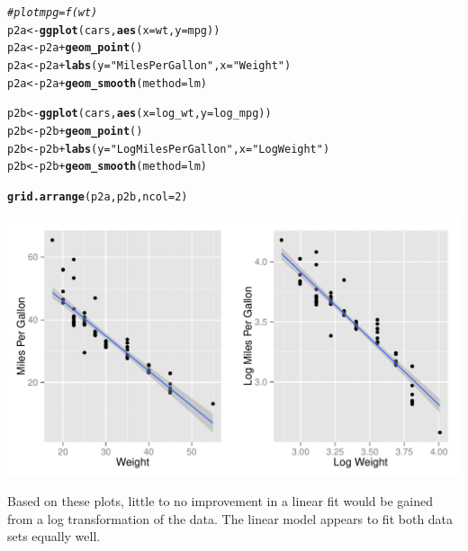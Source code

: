 \documentclass{article}\usepackage[]{graphicx}\usepackage[]{color}
\makeatletter
\def\maxwidth{ %
  \ifdim\Gin@nat@width>\linewidth
    \linewidth
  \else
    \Gin@nat@width
  \fi
}
\newcommand{\hlnum}[1]{\textcolor[rgb]{0.686,0.059,0.569}{#1}}%
\newcommand{\hlstr}[1]{\textcolor[rgb]{0.192,0.494,0.8}{#1}}%
\newcommand{\hlcom}[1]{\textcolor[rgb]{0.678,0.584,0.686}{\textit{#1}}}%
\newcommand{\hlopt}[1]{\textcolor[rgb]{0,0,0}{#1}}%
\newcommand{\hlstd}[1]{\textcolor[rgb]{0.345,0.345,0.345}{#1}}%
\newcommand{\hlkwb}[1]{\textcolor[rgb]{0.69,0.353,0.396}{#1}}%
\newcommand{\hlkwc}[1]{\textcolor[rgb]{0.333,0.667,0.333}{#1}}%
\newcommand{\hlkwd}[1]{\textcolor[rgb]{0.737,0.353,0.396}{\textbf{#1}}}%
\newenvironment{kframe}{%
 \def\at@end@of@kframe{}%
 \ifinner\ifhmode%
  \def\at@end@of@kframe{\end{minipage}}%
  \begin{minipage}{\columnwidth}%
 \fi\fi%
 \def\FrameCommand##1{\hskip\@totalleftmargin \hskip-\fboxsep
 \colorbox{shadecolor}{##1}\hskip-\fboxsep
     \hskip-\linewidth \hskip-\@totalleftmargin \hskip\columnwidth}%
 \MakeFramed {\advance\hsize-\width
   \@totalleftmargin\z@ \linewidth\hsize
   \@setminipage}}%
 {\par\unskip\endMakeFramed%
 \at@end@of@kframe}
\newenvironment{knitrout}{}{} %
\makeatother
\begin{document}
\begin{knitrout}
\color{fgcolor}\begin{kframe}
\begin{alltt}
\hlcom{# plot mpg = f(wt)}
\hlstd{p2a} \hlkwb{<-} \hlkwd{ggplot}\hlstd{(cars,} \hlkwd{aes}\hlstd{(}\hlkwc{x} \hlstd{= wt,} \hlkwc{y} \hlstd{= mpg))}
\hlstd{p2a} \hlkwb{<-} \hlstd{p2a} \hlopt{+} \hlkwd{geom_point}\hlstd{()}
\hlstd{p2a} \hlkwb{<-} \hlstd{p2a} \hlopt{+} \hlkwd{labs}\hlstd{(}\hlkwc{y} \hlstd{=} \hlstr{"Miles Per Gallon"}\hlstd{,} \hlkwc{x} \hlstd{=} \hlstr{"Weight"}\hlstd{)}
\hlstd{p2a} \hlkwb{<-} \hlstd{p2a} \hlopt{+} \hlkwd{geom_smooth}\hlstd{(}\hlkwc{method} \hlstd{= lm)}

\hlstd{p2b} \hlkwb{<-} \hlkwd{ggplot}\hlstd{(cars,} \hlkwd{aes}\hlstd{(}\hlkwc{x} \hlstd{= log_wt,} \hlkwc{y} \hlstd{= log_mpg))}
\hlstd{p2b} \hlkwb{<-} \hlstd{p2b} \hlopt{+} \hlkwd{geom_point}\hlstd{()}
\hlstd{p2b} \hlkwb{<-} \hlstd{p2b} \hlopt{+} \hlkwd{labs}\hlstd{(}\hlkwc{y} \hlstd{=} \hlstr{"Log Miles Per Gallon"}\hlstd{,} \hlkwc{x} \hlstd{=} \hlstr{"Log Weight"}\hlstd{)}
\hlstd{p2b} \hlkwb{<-} \hlstd{p2b} \hlopt{+} \hlkwd{geom_smooth}\hlstd{(}\hlkwc{method} \hlstd{= lm)}

\hlkwd{grid.arrange}\hlstd{(p2a, p2b,} \hlkwc{ncol} \hlstd{=} \hlnum{2}\hlstd{)}
\end{alltt}
\end{kframe}

{\centering \includegraphics[width=\maxwidth]{figure/2a-1} 

}



\end{knitrout}

Based on these plots, little to no improvement in a linear fit would be gained from a log transformation of the data.  The linear model appears to fit both data sets equally well.
\end{document}
